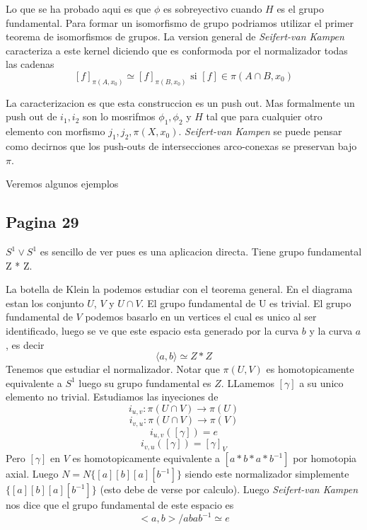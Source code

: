\documentclass[letterpaper]{article}
\newcommand{\vank}{\emph{Seifert-van Kampen} }
\begin{document}
Lo que se ha probado aqui es que \(\phi\) es sobreyectivo cuando \(H\)
es el grupo fundamental. Para formar un isomorfismo de grupo podriamos
utilizar el primer teorema de isomorfismos de grupos. La version general
de \vank caracteriza a este kernel diciendo que es conformoda por el
normalizador todas las cadenas
\[ [f]_{\pi (A,x_0)} \simeq [f]_{\pi (B, x_0)} \text{ si } [f] \in \pi
  (A \cap B, x_0) \]

La caracterizacion es que esta construccion es un push out. Mas
formalmente un push out de \(i_1, i_2\) son lo mosrifmos \(\phi_1,
\phi_2\) y \(H\) tal que para cualquier otro elemento con morfismo
\(j_1, j_2 , \pi (X,x_0)\). \vank se puede pensar como decirnos que los
push-outs de intersecciones arco-conexas se preservan bajo \(\pi\).

Veremos algunos ejemplos

\subsection*{Pagina 29}
\(S^1 \vee S^1\) es sencillo de ver pues es una aplicacion directa.
Tiene grupo fundamental Z * Z.

La botella de Klein la podemos estudiar con el teorema general. En el
diagrama estan los conjunto \(U\), \(V \) y \(U \cap V\). El grupo
fundamental de U es trivial. El grupo fundamental de \(V\) podemos
basarlo en un vertices el cual es unico al ser identificado, luego se ve
que este espacio esta generado por la curva \(b\) y la curva \(a\), es
decir
\[ \langle a,b \rangle \simeq Z * Z \]
Tenemos que estudiar el normalizador. Notar que \(\pi (U,V)\) es
homotopicamente equivalente a \(S^1\) luego su grupo fundamental es
\(Z\). LLamemos \([\gamma]\) a su unico elemento no trivial. Estudiamos
las inyeciones de
\[ i_{u,v} : \pi (U \cap V) \to \pi (U )\]
\[ i_{v,u} : \pi (U \cap V) \to \pi (V) \]
\[ i_{u,v} ([\gamma]) = e \]
\[ i_{v,u} ([\gamma]) = [\gamma]_{V} \]
Pero \([\gamma]\) en \(V\) es homotopicamente equivalente a \([a * b * a *
b^{-1}]\) por homotopia axial. Luego \(N = N \{[a][b][a][b^{-1}]\}\)
siendo este normalizador simplemente \(\{[a][b][a][b^{-1}]\}\) (esto
debe de verse por calculo). Luego \vank nos dice que el grupo
fundamental de este espacio es
\[ <a,b> / {abab^{-1} \simeq e}\]
\end{document}
